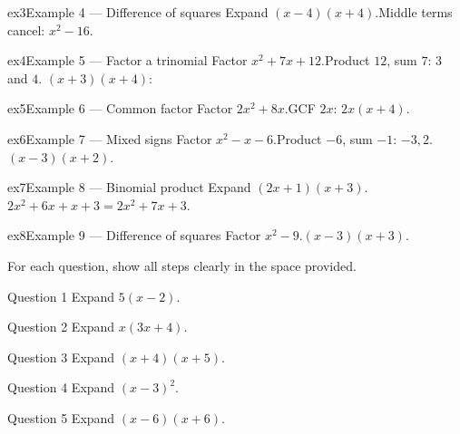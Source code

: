 \documentclass[11pt]{article}
\begin{document}
\begin{example}{ex3}{Example 4 --- Difference of squares}
Expand $(x-4)(x+4)$.\soln Middle terms cancel: $x^2-16$.
\end{example}

\begin{example}{ex4}{Example 5 --- Factor a trinomial}
Factor $x^2+7x+12$.\soln Product $12$, sum $7$: $3$ and $4$. $(x+3)(x+4)$:
\end{example}

\begin{example}{ex5}{Example 6 --- Common factor}
Factor $2x^2+8x$.\soln GCF $2x$: $2x(x+4)$.
\end{example}

\begin{example}{ex6}{Example 7 --- Mixed signs}
Factor $x^2-x-6$.\soln Product $-6$, sum $-1$: $-3,2$. $(x-3)(x+2)$.
\end{example}

\begin{example}{ex7}{Example 8 --- Binomial product}
Expand $(2x+1)(x+3)$.\soln $2x^2+6x+x+3=2x^2+7x+3$.
\end{example}

\begin{example}{ex8}{Example 9 --- Difference of squares}
Factor $x^2-9$.\soln $(x-3)(x+3)$.
\end{example}

\clearpage
{}
For each question, show all steps clearly in the space provided.

\begin{qbox}{Question 1}
Expand $5(x-2)$.\workspace{2.4cm}
\end{qbox}

\begin{qbox}{Question 2}
Expand $x(3x+4)$.\workspace{2.4cm}
\end{qbox}

\begin{qbox}{Question 3}
Expand $(x+4)(x+5)$.\workspace{2.4cm}
\end{qbox}

\begin{qbox}{Question 4}
Expand $(x-3)^2$.\workspace{2.4cm}
\end{qbox}

\begin{qbox}{Question 5}
Expand $(x-6)(x+6)$.\workspace{2.4cm}
\end{qbox}
\end{document}
